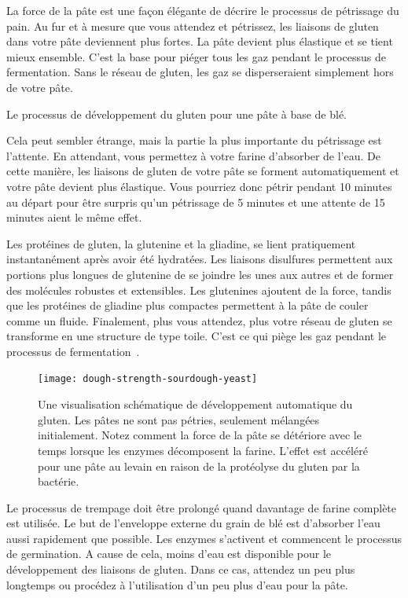 La force de la pâte est une façon élégante de décrire le processus de pétrissage du pain. Au fur et à mesure que vous attendez et pétrissez, les liaisons de gluten dans votre pâte deviennent plus fortes. La pâte devient plus élastique et se tient mieux ensemble. C'est la base pour piéger tous les gaz pendant le processus de fermentation. Sans le réseau de gluten, les gaz se disperseraient simplement hors de votre pâte.

\begin{flowchart}[!htb]
\begin{center}
  
  \caption{Le processus de développement du gluten pour une pâte à base de blé.}%
  \label{fig:wheat-sourdough-kneading-process}
\end{center}
\end{flowchart}

Cela peut sembler étrange, mais la partie la plus importante du pétrissage est l'attente. En attendant, vous permettez à votre farine d'absorber de l'eau. De cette manière, les liaisons de gluten de votre pâte se forment automatiquement et votre pâte devient plus élastique. Vous pourriez donc pétrir pendant 10 minutes au départ pour être surpris qu'un pétrissage de 5 minutes et une attente de 15 minutes aient le même effet.

Les protéines de gluten, la glutenine et la gliadine, se lient pratiquement instantanément après avoir été hydratées. Les liaisons disulfures permettent aux portions plus longues de glutenine de se joindre les unes aux autres et de former des molécules robustes et extensibles. Les glutenines ajoutent de la force, tandis que les protéines de gliadine plus compactes permettent à la pâte de couler comme un fluide. Finalement, plus vous attendez, plus votre réseau de gluten se transforme en une structure de type toile. C'est ce qui piège les gaz pendant le processus de fermentation~\cite{how+does+gluten+work}.

\begin{figure}[!htb]
  \texttt{[image: dough-strength-sourdough-yeast]}
  \caption[Force de la pâte dans le temps sans pétrissage]{Une visualisation schématique de développement automatique du gluten. Les pâtes ne sont pas pétries, seulement mélangées initialement. Notez comment la force de la pâte se détériore avec le temps lorsque les enzymes décomposent la farine. L'effet est accéléré pour une pâte au levain en raison de la protéolyse du gluten par la bactérie.}%
  \label{fig:wheat-yeast-sourdough-degradation}
\end{figure}
Le processus de trempage doit être prolongé quand davantage de farine complète est utilisée.
Le but de l'enveloppe externe du grain de blé est d'absorber l'eau aussi rapidement
que possible. Les enzymes s'activent et commencent le processus de germination.
A cause de cela, moins d'eau est disponible pour le développement des liaisons de gluten.
Dans ce cas, attendez un peu plus longtemps ou procédez à l'utilisation d'un peu plus d'eau pour
la pâte.

